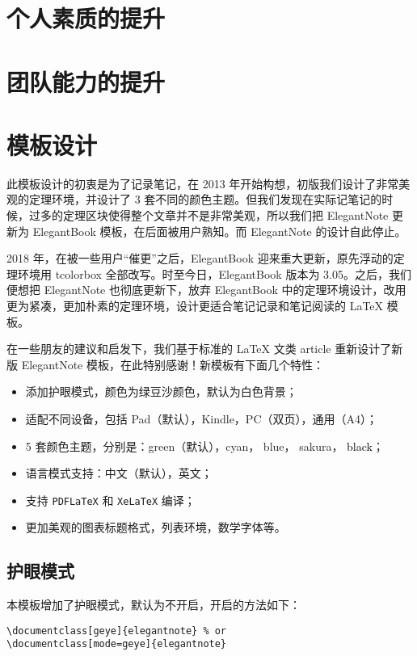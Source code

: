 \documentclass[cn,normal,12pt]{../elegantnote}
\begin{document}
\section{个人素质的提升}

\section{团队能力的提升}


\section{模板设计}
此模板设计的初衷是为了记录笔记，在 2013 年开始构想，初版我们设计了非常美观的定理环境，并设计了 3 套不同的颜色主题。但我们发现在实际记笔记的时候，过多的定理区块使得整个文章并不是非常美观，所以我们把 ElegantNote 更新为 ElegantBook 模板，在后面被用户熟知。而 ElegantNote 的设计自此停止。

2018 年，在被一些用户“催更”之后，ElegantBook 迎来重大更新，原先浮动的定理环境用 tcolorbox 全部改写。时至今日，ElegantBook 版本为 3.05。之后，我们便想把 ElegantNote 也彻底更新下，放弃 ElegantBook 中的定理环境设计，改用更为紧凑，更加朴素的定理环境，设计更适合笔记记录和笔记阅读的 \LaTeX{} 模板。

在一些朋友的建议和启发下，我们基于标准的 \LaTeX{} 文类 article 重新设计了新版 ElegantNote 模板，在此特别感谢！新模板有下面几个特性：
\begin{itemize}
\item 添加护眼模式，颜色为绿豆沙颜色，默认为白色背景；
\item 适配不同设备，包括 Pad（默认），Kindle，PC（双页），通用（A4）；
\item 5 套颜色主题，分别是：\textcolor{egreen}{green}（默认），\textcolor{ecyan}{cyan}， \textcolor{eblue}{blue}， \textcolor{sakura}{sakura}， \textcolor{black}{black}；
\item 语言模式支持：中文（默认），英文；
\item 支持 \lstinline{PDFLaTeX} 和 \lstinline{XeLaTeX} 编译；
\item 更加美观的图表标题格式，列表环境，数学字体等。
\end{itemize}

\subsection{护眼模式}
本模板增加了护眼模式，默认为不开启，开启的方法如下：
\begin{lstlisting}[frame=none]  
\documentclass[geye]{elegantnote} % or
\documentclass[mode=geye]{elegantnote}
\end{lstlisting}
\end{document}
